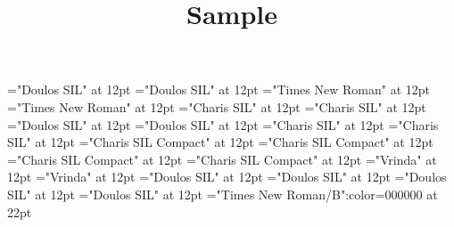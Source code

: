 \documentclass[a4paper,twoside]{article}
\begin{document}
\font\spanenfonipa="Doulos SIL" at 12pt
\font\divenfonipa="Doulos SIL" at 12pt
\font\spande="Times New Roman" at 12pt
\font\divde="Times New Roman" at 12pt
\font\spanbzh="Charis SIL" at 12pt
\font\divbzh="Charis SIL" at 12pt
\font\spanbzhfonipa="Doulos SIL" at 12pt
\font\divbzhfonipa="Doulos SIL" at 12pt
\font\spanbss="Charis SIL" at 12pt
\font\divbss="Charis SIL" at 12pt
\font\spanbssxako="Charis SIL Compact" at 12pt
\font\divbssxako="Charis SIL Compact" at 12pt
\font\spanbssfonipa="Charis SIL Compact" at 12pt
\font\divbssfonipa="Charis SIL Compact" at 12pt
\font\spanbn="Vrinda" at 12pt
\font\divbn="Vrinda" at 12pt
\font\spanauc="Doulos SIL" at 12pt
\font\divauc="Doulos SIL" at 12pt
\font\spanaucfonipaxemic="Doulos SIL" at 12pt
\font\divaucfonipaxemic="Doulos SIL" at 12pt
\color{black} 
\thispagestyle{empty} 
\font\CoverPageHeading="Times New Roman/B":color=000000 at 22pt 
\vskip 60pt 
\begin{center} 
\end{center} 
\newpage 
\newpage 
\thispagestyle{empty} 
\mbox{} 
\title{Sample} 
\author{  } 
\maketitle 
\thispagestyle{empty} 
\newpage 
\newpage 
\mbox{} 
\setcounter{page}{1} 
 
\pagestyle{plain} 
\newpage 
\newpage 
\thispagestyle{empty} 
\mbox{} 

\pagestyle{plain} 
\tableofcontents 
\newpage 
\setcounter{page}{1} 
\end{document}
